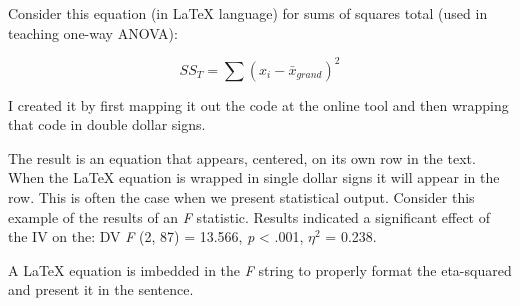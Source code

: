 \documentclass[
]{book}
\newenvironment{Shaded}{\begin{snugshade}}{\end{snugshade}}
\newcommand{\ControlFlowTok}[1]{\textcolor[rgb]{0.13,0.29,0.53}{\textbf{#1}}}
\newcommand{\DecValTok}[1]{\textcolor[rgb]{0.00,0.00,0.81}{#1}}
\newcommand{\ErrorTok}[1]{\textcolor[rgb]{0.64,0.00,0.00}{\textbf{#1}}}
\newcommand{\FloatTok}[1]{\textcolor[rgb]{0.00,0.00,0.81}{#1}}
\newcommand{\FunctionTok}[1]{\textcolor[rgb]{0.00,0.00,0.00}{#1}}
\newcommand{\NormalTok}[1]{#1}
\newcommand{\OtherTok}[1]{\textcolor[rgb]{0.56,0.35,0.01}{#1}}
\newcommand{\SpecialCharTok}[1]{\textcolor[rgb]{0.00,0.00,0.00}{#1}}
\begin{document}
Consider this equation (in LaTeX language) for sums of squares total (used in teaching one-way ANOVA):

\[SS_{T}= \sum (x_{i}-\bar{x}_{grand})^{2}\]

I created it by first mapping it out the code at the online tool and then wrapping that code in double dollar signs.

\begin{Shaded}
\end{Shaded}

The result is an equation that appears, centered, on its own row in the text. When the LaTeX equation is wrapped in single dollar signs it will appear in the row. This is often the case when we present statistical output. Consider this example of the results of an \emph{F} statistic. Results indicated a significant effect of the IV on the: DV \emph{F} (2, 87) = 13.566, \emph{p} \textless{} .001, \(\eta^2\) = 0.238.

A LaTeX equation is imbedded in the \emph{F} string to properly format the eta-squared and present it in the sentence.

\begin{Shaded}
\end{Shaded}
\end{document}

